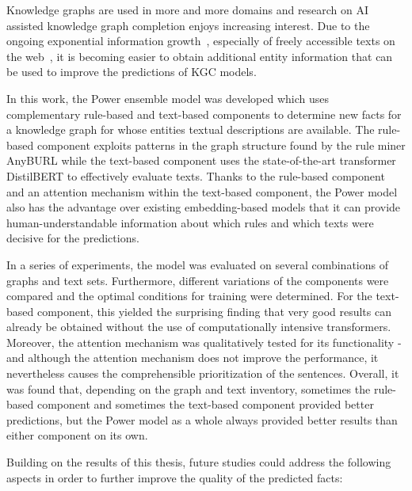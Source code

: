 Knowledge graphs are used in more and more domains and research on AI assisted knowledge graph completion enjoys increasing interest. Due to the ongoing exponential information growth~\cite{}, especially of freely accessible texts on the web~\cite{}, it is becoming easier to obtain additional entity information that can be used to improve the predictions of KGC models.

In this work, the Power ensemble model was developed which uses complementary rule-based and text-based components to determine new facts for a knowledge graph for whose entities textual descriptions are available. The rule-based component exploits patterns in the graph structure found by the rule miner AnyBURL while the text-based component uses the state-of-the-art transformer DistilBERT to effectively evaluate texts. Thanks to the rule-based component and an attention mechanism within the text-based component, the Power model also has the advantage over existing embedding-based models that it can provide human-understandable information about which rules and which texts were decisive for the predictions.

In a series of experiments, the model was evaluated on several combinations of graphs and text sets. Furthermore, different variations of the components were compared and the optimal conditions for training were determined. For the text-based component, this yielded the surprising finding that very good results can already be obtained without the use of computationally intensive transformers. Moreover, the attention mechanism was qualitatively tested for its functionality - and although the attention mechanism does not improve the performance, it nevertheless causes the comprehensible prioritization of the sentences. Overall, it was found that, depending on the graph and text inventory, sometimes the rule-based component and sometimes the text-based component provided better predictions, but the Power model as a whole always provided better results than either component on its own.

Building on the results of this thesis, future studies could address the following aspects in order to further improve the quality of the predicted facts:


